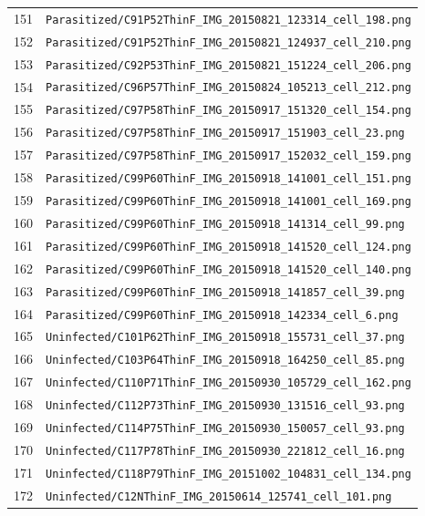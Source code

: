 \begin{longtable}{r p{12cm}}
151 & \texttt{Parasitized/C91P52ThinF\_IMG\_20150821\_123314\_cell\_198.png} \\
152 & \texttt{Parasitized/C91P52ThinF\_IMG\_20150821\_124937\_cell\_210.png} \\
153 & \texttt{Parasitized/C92P53ThinF\_IMG\_20150821\_151224\_cell\_206.png} \\
154 & \texttt{Parasitized/C96P57ThinF\_IMG\_20150824\_105213\_cell\_212.png} \\
155 & \texttt{Parasitized/C97P58ThinF\_IMG\_20150917\_151320\_cell\_154.png} \\
156 & \texttt{Parasitized/C97P58ThinF\_IMG\_20150917\_151903\_cell\_23.png} \\
157 & \texttt{Parasitized/C97P58ThinF\_IMG\_20150917\_152032\_cell\_159.png} \\
158 & \texttt{Parasitized/C99P60ThinF\_IMG\_20150918\_141001\_cell\_151.png} \\
159 & \texttt{Parasitized/C99P60ThinF\_IMG\_20150918\_141001\_cell\_169.png} \\
160 & \texttt{Parasitized/C99P60ThinF\_IMG\_20150918\_141314\_cell\_99.png} \\
161 & \texttt{Parasitized/C99P60ThinF\_IMG\_20150918\_141520\_cell\_124.png} \\
162 & \texttt{Parasitized/C99P60ThinF\_IMG\_20150918\_141520\_cell\_140.png} \\
163 & \texttt{Parasitized/C99P60ThinF\_IMG\_20150918\_141857\_cell\_39.png} \\
164 & \texttt{Parasitized/C99P60ThinF\_IMG\_20150918\_142334\_cell\_6.png} \\
165 & \texttt{Uninfected/C101P62ThinF\_IMG\_20150918\_155731\_cell\_37.png} \\
166 & \texttt{Uninfected/C103P64ThinF\_IMG\_20150918\_164250\_cell\_85.png} \\
167 & \texttt{Uninfected/C110P71ThinF\_IMG\_20150930\_105729\_cell\_162.png} \\
168 & \texttt{Uninfected/C112P73ThinF\_IMG\_20150930\_131516\_cell\_93.png} \\
169 & \texttt{Uninfected/C114P75ThinF\_IMG\_20150930\_150057\_cell\_93.png} \\
170 & \texttt{Uninfected/C117P78ThinF\_IMG\_20150930\_221812\_cell\_16.png} \\
171 & \texttt{Uninfected/C118P79ThinF\_IMG\_20151002\_104831\_cell\_134.png} \\
172 & \texttt{Uninfected/C12NThinF\_IMG\_20150614\_125741\_cell\_101.png} \\

\end{longtable}

